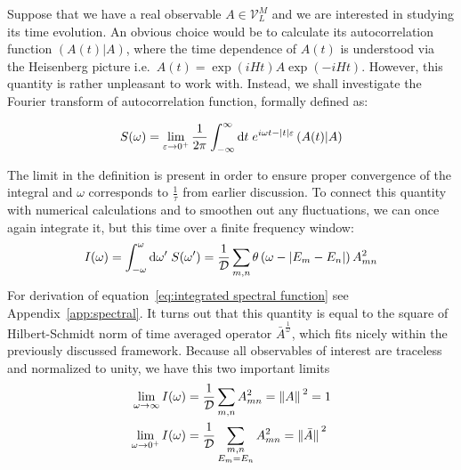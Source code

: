 Suppose that we have a real observable \(A \in \mathcal{V}_L^M\) and we are interested in studying its time
evolution. An obvious choice would be to calculate its autocorrelation function
\((A(t)|A)\), where the time dependence of \(A(t)\) is understood
via the Heisenberg picture i.e.\ \(A(t) = \exp\left(i H t\right) A
\exp\left(-i H t\right)\). However, this quantity is rather unpleasant to work with.
Instead, we shall investigate the Fourier transform of autocorrelation function, formally
defined as:
\begin{definition}  
  \begin{equation*}
  S(\omega) =  \lim _{\varepsilon \to 0^+} \frac{1}{2 \pi} \int_{-\infty}^{\infty} \mathrm{d} t 
  \; e^{i \omega t-|t| \varepsilon}\left(A(t) \middle| A\right)
  \end{equation*}
  \label{def:spectral function}
\end{definition}
The limit in the definition is present in order to ensure proper convergence of the integral
and \(\omega{}\) corresponds to \(\frac{1}{\tau}\) from earlier discussion.
To connect this quantity with numerical calculations and to smoothen out any fluctuations, we
can once again integrate it, but this time over a finite frequency window:
\begin{equation}
  I(\omega) = \int_{-\omega}^{\omega} \mathrm{d}\omega^{\prime} \; S(\omega^{\prime}) = 
  \frac{1}{\mathcal{D}} \sum_{m,n} \theta\left(\omega - |E_m-E_n|\right) A_{mn}^2
  \label{eq:integrated spectral function}
\end{equation}
For derivation of equation~\eqref{eq:integrated spectral function} see Appendix~\ref{app:spectral}.
It turns out that this quantity is equal to the square of Hilbert-Schmidt norm of time
averaged operator \(\bar{A}^{\frac{1}{\omega}}\), which fits nicely within the previously
discussed framework. Because all observables of interest are traceless and
normalized to unity, we have this two important limits
\begin{align}
  \lim_{\omega \to \infty } I(\omega) &= \frac{1}{\mathcal{D}}\sum_{m,n} A_{mn}^2 = \norm*{A}^2 = 1\\
  \lim_{\omega \to 0^+ } I(\omega) &= \frac{1}{\mathcal{D}} \sum_{ \substack{m,n\\E_m=E_n} } A_{mn}^2 = \norm*{\bar{A}}^2
\end{align}

